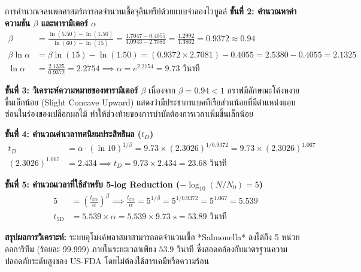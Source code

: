 \begin{examplebox}{การคำนวณจลนพลศาสตร์การลดจำนวนเชื้อจุลินทรีย์ด้วยแบบจำลองไวบูลล์}
\textbf{ขั้นที่ 2: คำนวณหาค่าความชัน $\beta$ และพารามิเตอร์ $\alpha$}
\begin{align*}
    \beta &= \frac{\ln(5.50) - \ln(1.50)}{\ln(60) - \ln(15)} = \frac{1.7047 - 0.4055}{4.0943 - 2.7081} = \frac{1.2992}{1.3862} = 0.9372 \approx 0.94 \\
    \beta \ln \alpha &= \beta \ln(15) - \ln(1.50) = (0.9372 \times 2.7081) - 0.4055 = 2.5380 - 0.4055 = 2.1325 \\
    \ln \alpha &= \frac{2.1325}{0.9372} = 2.2754 \implies \alpha = e^{2.2754} = 9.73 \text{ วินาที}
\end{align*}

\textbf{ขั้นที่ 3: วิเคราะห์ความหมายของพารามิเตอร์ $\beta$}
เนื่องจาก $\beta = 0.94 < 1$ กราฟมีลักษณะโค้งหงายขึ้นเล็กน้อย (Slight Concave Upward) แสดงว่ามีประชากรแบคทีเรียส่วนน้อยที่มีตำแหน่งแอบซ่อนในร่องของเปลือกผลไม้ ทำให้ช่วงท้ายของการบำบัดต้องการเวลาเพิ่มขึ้นเล็กน้อย

\textbf{ขั้นที่ 4: คำนวณค่าเวลาทศนิยมประสิทธิผล ($t_D$)}
\begin{align*}
    t_D &= \alpha \cdot (\ln 10)^{1/\beta} = 9.73 \times (2.3026)^{1/0.9372} = 9.73 \times (2.3026)^{1.067} \\
    (2.3026)^{1.067} &= 2.434 \implies t_D = 9.73 \times 2.434 = 23.68 \text{ วินาที}
\end{align*}

\textbf{ขั้นที่ 5: คำนวณเวลาที่ใช้สำหรับ 5-log Reduction ($-\log_{10}(N/N_0) = 5$)}
\begin{align*}
    5 &= \left( \frac{t_{5\text{D}}}{\alpha} \right)^\beta \implies \frac{t_{5\text{D}}}{\alpha} = 5^{1/\beta} = 5^{1/0.9372} = 5^{1.067} = 5.539 \\
    t_{5\text{D}} &= 5.539 \times \alpha = 5.539 \times 9.73 \text{ s} = 53.89 \text{ วินาที}
\end{align*}

\textbf{สรุปผลการวิเคราะห์:} ระบบอุโมงค์พลาสมาสามารถลดจำนวนเชื้อ *Salmonella* ลงได้ถึง 5 หน่วยลอการิทึม (ร้อยละ 99.999) ภายในระยะเวลาเพียง $53.9 \text{ วินาที}$ ซึ่งสอดคล้องกับมาตรฐานความปลอดภัยระดับสูงของ US-FDA โดยไม่ต้องใช้สารเคมีหรือความร้อน
\end{examplebox}

